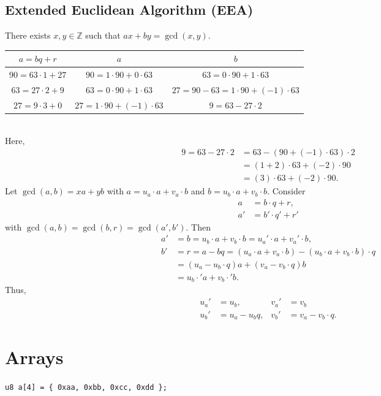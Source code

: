 \subsection{Extended Euclidean Algorithm (EEA)}
There exists $x,y\in\mathbb{Z}$ such that
$ax+by=\gcd(x,y).$
\begin{table}[h!]\centering{}
	\begin{tabular}{c||c|c}\toprule[1.2pt]
		$a=bq+r$ & $a$ & $b$ \\ \hline
		$90=63\cdot 1 + 27$ & $90=1\cdot 90+0\cdot 63$ & $63=0\cdot 90+1\cdot 63$ \\
		$63=27\cdot 2 + 9$ & $63=0\cdot 90+1\cdot 63$ & $27 = 90 - 63 = 1\cdot 90 + (-1)\cdot 63$ \\
		$27=9\cdot 3 + 0$ & $27 = 1\cdot 90 + (-1)\cdot 63$ & $9=63-27\cdot 2$ \\ \bottomrule[1.2pt]
	\end{tabular}
\end{table}\\ Here, \begin{align*}
9 = 63 - 27\cdot 2
&= 63 - (90+(-1)\cdot 63)\cdot 2 \\
&= (1+2)\cdot 63 + (-2)\cdot 90 \\
&= (3)\cdot 63 + (-2)\cdot 90.
\end{align*}
Let $\gcd(a,b)=xa+yb$ with $a=u_a\cdot a+v_a\cdot b$ and $b=u_b\cdot a+v_b\cdot b$. Consider \begin{align*}
	a&=b\cdot q+r,\\ a'&=b'\cdot q'+r'
\end{align*} with $\gcd(a,b)=\gcd(b,r)=\gcd(a',b')$. Then \begin{align*}
a' &=b=u_b\cdot a+v_b\cdot b = u_a'\cdot a+v_a'\cdot b,\\
b'&=r=a-bq=(u_a\cdot a+v_a\cdot b)-(u_b\cdot a+v_b\cdot b)\cdot q\\
&=(u_a-u_b\cdot q)a+(v_a-v_b\cdot q)b\\
&=u_b\cdot 'a+v_b\cdot 'b.
\end{align*} Thus, \begin{align*}
u_a'&=u_b, &v_a'&=v_b \\
u_b'&=u_a-u_bq, &v_b'&=v_a-v_b\cdot q.
\end{align*}


\section{Arrays}
\texttt{u8 a[4] = \{ 0xaa, 0xbb, 0xcc, 0xdd \};}


